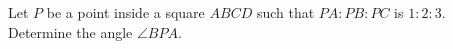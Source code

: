 Let $P$ be a point inside a square $ABCD$ such that $PA:PB:PC$ is $1:2:3$. Determine the angle $\angle BPA$.